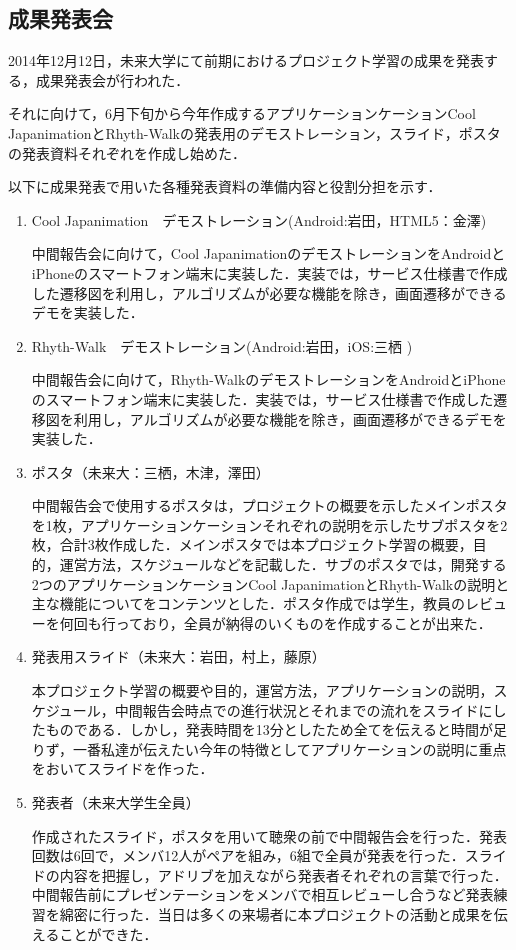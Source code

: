 \subsection{成果発表会}
\par
2014年12月12日，未来大学にて前期におけるプロジェクト学習の成果を発表する，成果発表会が行われた．
\par
それに向けて，6月下旬から今年作成するアプリケーションケーションCool JapanimationとRhyth-Walkの発表用のデモストレーション，スライド，ポスタの発表資料それぞれを作成し始めた．
\par
以下に成果発表で用いた各種発表資料の準備内容と役割分担を示す．
\begin{enumerate}
\item
Cool Japanimation　デモストレーション(Android:岩田，HTML5：金澤)
\par 中間報告会に向けて，Cool JapanimationのデモストレーションをAndroidとiPhoneのスマートフォン端末に実装した．実装では，サービス仕様書で作成した遷移図を利用し，アルゴリズムが必要な機能を除き，画面遷移ができるデモを実装した．
\item Rhyth-Walk　デモストレーション(Android:岩田，iOS:三栖 )
\par
中間報告会に向けて，Rhyth-WalkのデモストレーションをAndroidとiPhoneのスマートフォン端末に実装した．実装では，サービス仕様書で作成した遷移図を利用し，アルゴリズムが必要な機能を除き，画面遷移ができるデモを実装した．
\item ポスタ（未来大：三栖，木津，澤田）
\par
中間報告会で使用するポスタは，プロジェクトの概要を示したメインポスタを1枚，アプリケーションケーションそれぞれの説明を示したサブポスタを2枚，合計3枚作成した．メインポスタでは本プロジェクト学習の概要，目的，運営方法，スケジュールなどを記載した．サブのポスタでは，開発する2つのアプリケーションケーションCool JapanimationとRhyth-Walkの説明と主な機能についてをコンテンツとした．ポスタ作成では学生，教員のレビューを何回も行っており，全員が納得のいくものを作成することが出来た．
\item 発表用スライド（未来大：岩田，村上，藤原）
\par
本プロジェクト学習の概要や目的，運営方法，アプリケーションの説明，スケジュール，中間報告会時点での進行状況とそれまでの流れをスライドにしたものである．しかし，発表時間を13分としたため全てを伝えると時間が足りず，一番私達が伝えたい今年の特徴としてアプリケーションの説明に重点をおいてスライドを作った．
\item 発表者（未来大学生全員）
\par
作成されたスライド，ポスタを用いて聴衆の前で中間報告会を行った．発表回数は6回で，メンバ12人がペアを組み，6組で全員が発表を行った．スライドの内容を把握し，アドリブを加えながら発表者それぞれの言葉で行った．中間報告前にプレゼンテーションをメンバで相互レビューし合うなど発表練習を綿密に行った．当日は多くの来場者に本プロジェクトの活動と成果を伝えることができた．

\end{enumerate}
